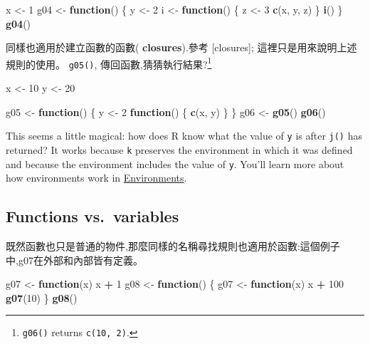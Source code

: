 \documentclass[]{book}
\newenvironment{Shaded}{\begin{snugshade}}{\end{snugshade}}
\newcommand{\ControlFlowTok}[1]{\textcolor[rgb]{0.13,0.29,0.53}{\textbf{#1}}}
\newcommand{\DecValTok}[1]{\textcolor[rgb]{0.00,0.00,0.81}{#1}}
\newcommand{\KeywordTok}[1]{\textcolor[rgb]{0.13,0.29,0.53}{\textbf{#1}}}
\newcommand{\NormalTok}[1]{#1}
\newcommand{\OperatorTok}[1]{\textcolor[rgb]{0.81,0.36,0.00}{\textbf{#1}}}
\newcommand{\StringTok}[1]{\textcolor[rgb]{0.31,0.60,0.02}{#1}}
\let\rmarkdownfootnote\footnote%
\def\footnote{\protect\rmarkdownfootnote}
\theoremstyle{definition}
\theoremstyle{definition}
\theoremstyle{definition}
\theoremstyle{remark}
\begin{document}
\begin{Shaded}
\begin{Highlighting}[]
\NormalTok{x <-}\StringTok{ }\DecValTok{1}
\NormalTok{g04 <-}\StringTok{ }\ControlFlowTok{function}\NormalTok{() \{}
\NormalTok{  y <-}\StringTok{ }\DecValTok{2}
\NormalTok{  i <-}\StringTok{ }\ControlFlowTok{function}\NormalTok{() \{}
\NormalTok{    z <-}\StringTok{ }\DecValTok{3}
    \KeywordTok{c}\NormalTok{(x, y, z)}
\NormalTok{  \}}
  \KeywordTok{i}\NormalTok{()}
\NormalTok{\}}
\KeywordTok{g04}\NormalTok{()}
\end{Highlighting}
\end{Shaded}

同樣也適用於建立函數的函數( \textbf{closures}).參考 {[}closures{]};
這裡只是用來說明上述規則的使用。 \texttt{g05()},
傳回函數,猜猜執行結果?\footnote{\texttt{g06()} returns
  \texttt{c(10,\ 2)}.}

\begin{Shaded}
\begin{Highlighting}[]
\NormalTok{x <-}\StringTok{ }\DecValTok{10}
\NormalTok{y <-}\StringTok{ }\DecValTok{20}

\NormalTok{g05 <-}\StringTok{ }\ControlFlowTok{function}\NormalTok{() \{}
\NormalTok{  y <-}\StringTok{ }\DecValTok{2}
  \ControlFlowTok{function}\NormalTok{() \{}
    \KeywordTok{c}\NormalTok{(x, y)}
\NormalTok{  \}}
\NormalTok{\}}
\NormalTok{g06 <-}\StringTok{ }\KeywordTok{g05}\NormalTok{()}
\KeywordTok{g06}\NormalTok{()}
\end{Highlighting}
\end{Shaded}

This seems a little magical: how does R know what the value of
\texttt{y} is after \texttt{j()} has returned? It works because
\texttt{k} preserves the environment in which it was defined and because
the environment includes the value of \texttt{y}. You'll learn more
about how environments work in
\protect\hyperlink{environments}{Environments}.

\hypertarget{functions-vs.variables}{%
\subsection{Functions vs.~variables}\label{functions-vs.variables}}

既然函數也只是普通的物件,那麼同樣的名稱尋找規則也適用於函數:這個例子中,g07在外部和內部皆有定義。

\begin{Shaded}
\begin{Highlighting}[]
\NormalTok{g07 <-}\StringTok{ }\ControlFlowTok{function}\NormalTok{(x) x }\OperatorTok{+}\StringTok{ }\DecValTok{1}
\NormalTok{g08 <-}\StringTok{ }\ControlFlowTok{function}\NormalTok{() \{}
\NormalTok{  g07 <-}\StringTok{ }\ControlFlowTok{function}\NormalTok{(x) x }\OperatorTok{+}\StringTok{ }\DecValTok{100}
  \KeywordTok{g07}\NormalTok{(}\DecValTok{10}\NormalTok{)}
\NormalTok{\}}
\KeywordTok{g08}\NormalTok{()}
\end{Highlighting}
\end{Shaded}
\end{document}
